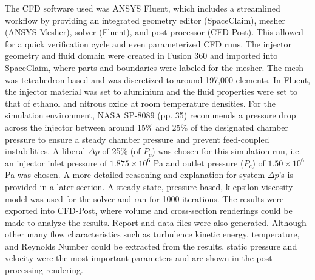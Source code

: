 \documentclass[9pt]{article} %
\numberwithin{equation}{section} %
\begin{document}
The CFD software used was ANSYS Fluent, which includes a streamlined workflow by providing an integrated geometry editor (SpaceClaim), mesher (ANSYS Mesher), solver (Fluent), and post-processor (CFD-Post). This allowed for a quick verification cycle and even parameterized CFD runs. The injector geometry and fluid domain were created in Fusion 360 and imported into SpaceClaim, where parts and boundaries were labeled for the mesher. The mesh was tetrahedron-based and was discretized to around 197,000 elements. In Fluent, the injector material was set to aluminium and the fluid properties were set to that of ethanol and nitrous oxide at room temperature densities. For the simulation environment, NASA SP-8089 (pp. 35) recommends a pressure drop across the injector between around 15\% and 25\% of the designated chamber pressure to ensure a steady chamber pressure and prevent feed-coupled instabilities. A liberal $\Delta p$ of 25\% (of $P_{c}$) was chosen for this simulation run, i.e. an injector inlet pressure of $1.875 \times 10^{6}$ Pa and outlet pressure ($P_{c}$) of $1.50 \times 10^{6}$ Pa was chosen. A more detailed reasoning and explanation for system $\Delta p$'s is provided in a later section. A steady-state, pressure-based, k-epsilon viscosity model was used for the solver and ran for 1000 iterations. The results were exported into CFD-Post, where volume and cross-section renderings could be made to analyze the results. Report and data files were also generated. Although other many flow characteristics such as turbulence kinetic energy, temperature, and Reynolds Number could be extracted from the results, static pressure and velocity were the most important parameters and are shown in the post-processing rendering.
\end{document}
